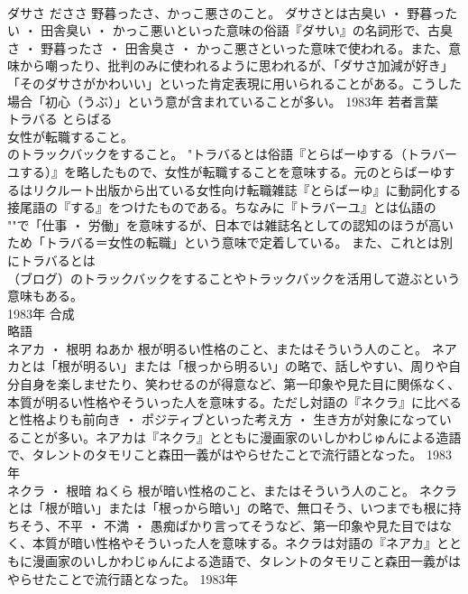 \documentclass[8pt]{extreport}
\begin{document}
\begin{CJK}{UTF8}{min}
\\	ダサさ	だささ	野暮ったさ、かっこ悪さのこと。	ダサさとは古臭い ・ 野暮ったい ・ 田舎臭い ・ かっこ悪いといった意味の俗語『ダサい』の名詞形で、古臭さ ・ 野暮ったさ ・ 田舎臭さ ・ かっこ悪さといった意味で使われる。また、意味から嘲ったり、批判のみに使われるように思われるが、「ダサさ加減が好き」「そのダサさがかわいい」といった肯定表現に用いられることがある。こうした場合「初心（うぶ）」という意が含まれていることが多い。	1983年	若者言葉	
\\	トラバる	とらばる	
\\	女性が転職すること。 
\\	のトラックバックをすること。	"トラバるとは俗語『とらばーゆする（トラバーユする）』を略したもので、女性が転職することを意味する。元のとらばーゆするはリクルート出版から出ている女性向け転職雑誌『とらばーゆ』に動詞化する接尾語の『する』をつけたものである。ちなみに『トラバーユ』とは仏語の
\\	""で「仕事 ・ 労働」を意味するが、日本では雑誌名としての認知のほうが高いため「トラバる＝女性の転職」という意味で定着している。 また、これとは別にトラバるとは
\\	（ブログ）のトラックバックをすることやトラックバックを活用して遊ぶという意味もある。
\\	1983年	合成 
\\	略語	
\\	ネアカ ・ 根明	ねあか	根が明るい性格のこと、またはそういう人のこと。	ネアカとは「根が明るい」または「根っから明るい」の略で、話しやすい、周りや自分自身を楽しませたり、笑わせるのが得意など、第一印象や見た目に関係なく、本質が明るい性格やそういった人を意味する。ただし対語の『ネクラ』に比べると性格よりも前向き ・ ポジティブといった考え方 ・ 生き方が対象になっていることが多い。ネアカは『ネクラ』とともに漫画家のいしかわじゅんによる造語で、タレントのタモリこと森田一義がはやらせたことで流行語となった。	1983年	
\\	ネクラ ・ 根暗	ねくら	根が暗い性格のこと、またはそういう人のこと。	ネクラとは「根が暗い」または「根っから暗い」の略で、無口そう、いつまでも根に持ちそう、不平 ・ 不満 ・ 愚痴ばかり言ってそうなど、第一印象や見た目ではなく、本質が暗い性格やそういった人を意味する。ネクラは対語の『ネアカ』とともに漫画家のいしかわじゅんによる造語で、タレントのタモリこと森田一義がはやらせたことで流行語となった。	1983年	

\end{CJK}
\end{document}
